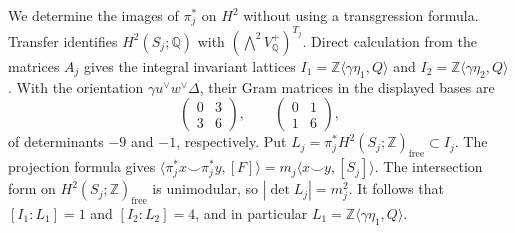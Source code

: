 \documentclass[11pt]{article}
\theoremstyle{definition}
\theoremstyle{remark}
\numberwithin{equation}{section}
\begin{document}
We determine the images of $\pi_j^*$ on $H^2$ without using a
transgression formula.  Transfer identifies $H^2(S_j;\mathbb Q)$ with
$(\bigwedge^2V^+_{\mathbb Q})^{T_j}$.  Direct calculation from the matrices
$A_j$ gives the integral invariant lattices
$I_1=\mathbb Z\langle \gamma\eta_1,Q\rangle$ and
$I_2=\mathbb Z\langle \gamma\eta_2,Q\rangle$.
With the orientation
$\gamma u^\vee w^\vee\Delta$, their Gram matrices in the displayed bases
are
\[
 \begin{pmatrix}0&3\\3&6\end{pmatrix},
 \qquad
 \begin{pmatrix}0&1\\1&6\end{pmatrix},
\]
of determinants $-9$ and $-1$, respectively.  Put
$L_j=\pi_j^*H^2(S_j;\mathbb Z)_{\mathrm{free}}\subset I_j$.
The projection formula gives
$\langle\pi_j^*x\smile\pi_j^*y,[F]\rangle
=m_j\langle x\smile y,[S_j]\rangle$.
The intersection form on $H^2(S_j;\mathbb Z)_{\mathrm{free}}$ is
unimodular, so $|\det L_j|=m_j^2$.  It follows that
$[I_1:L_1]=1$ and $[I_2:L_2]=4$, and in particular
$L_1=\mathbb Z\langle \gamma\eta_1,Q\rangle$.
\end{document}
